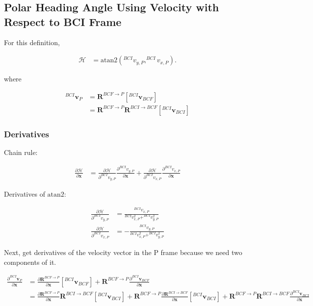 \documentclass[]{article}
\newcommand{\vb}[1]{\bm{#1}} %
\newcommand{\pd}[2]{\frac{\partial #1}{\partial #2}} %
\begin{document}
\subsection{Polar Heading Angle Using Velocity with Respect to BCI Frame}

For this definition,

\begin{align}
\mathcal{H} &= \mathrm{atan2} \left( ^{BCI} {v}_{y, P}, ^{BCI} {v}_{x, P} \right).
\end{align}

\noindent where

\begin{align}
^{BCI} \vb{v}_P &= \vb{R}^{BCF \rightarrow P} \left[ ^{BCI} \vb{v}_{BCF} \right] \\
&= \vb{R}^{BCF \rightarrow P} \vb{R}^{BCI \rightarrow BCF} \left[ ^{BCI} \vb{v}_{BCI} \right]
\end{align}

\subsubsection{Derivatives}

Chain rule:

\begin{align}
\pd{\mathcal{H}}{\vb{x}} &= \pd{\mathcal{H}}{^{BCI} v_{y, P}} \pd{^{BCI} v_{y, P}}{\vb{x}} + \pd{\mathcal{H}}{^{BCI} v_{x, P}} \pd{^{BCI} v_{x, P}}{\vb{x}}  
\end{align}

Derivatives of $\mathrm{atan2}$:

\begin{align}
\pd{\mathcal{H}}{^{BCI} {v}_{y, P}} &= \frac{^{BCI} v_{x, P}}{^{BCI} v_{x, P}^2 + ^{BCI} v_{y, P}^2} \\
\pd{\mathcal{H}}{^{BCI} {v}_{x, P}} &= - \frac{^{BCI} v_{y, P}}{^{BCI} v_{x, P}^2 + ^{BCI} v_{y, P}^2}
\end{align}

Next, get derivatives of the velocity vector in the P frame because we need two components of it.

\begin{align}
\label{eq:v_polar_wrt_bci_derivative}
\pd{^{BCI} \vb{v}_P}{\vb{x}} &= \pd{\vb{R}^{BCF \rightarrow P}}{\vb{x}} \left[ ^{BCI} \vb{v}_{BCF} \right] + \vb{R}^{BCF \rightarrow P} \pd{^{BCI} \vb{v}_{BCF}}{\vb{x}} \\
&= \pd{\vb{R}^{BCF \rightarrow P}}{\vb{x}} \vb{R}^{BCI \rightarrow BCF} \left[ ^{BCI} \vb{v}_{BCI} \right] + \vb{R}^{BCF \rightarrow P} \pd{\vb{R}^{BCI \rightarrow BCF}}{\vb{x}} \left[ ^{BCI} \vb{v}_{BCI} \right] + \vb{R}^{BCF \rightarrow P} \vb{R}^{BCI \rightarrow BCF} \pd{^{BCI} \vb{v}_{BCI}}{\vb{x}}
\end{align}
\end{document}
